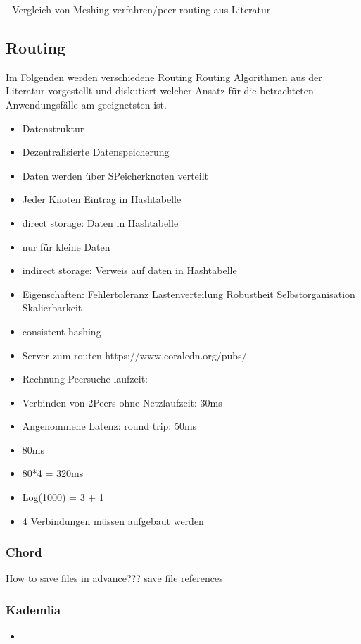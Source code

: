 - Vergleich von Meshing verfahren/peer routing aus Literatur
\subsection{Routing}
Im Folgenden werden verschiedene Routing \pTp Routing Algorithmen aus der Literatur vorgestellt und diskutiert welcher Ansatz für die betrachteten Anwendungsfälle am geeignetsten ist.

\begin{itemize}
	\item Datenstruktur
	\item  Dezentralisierte Datenspeicherung
	\item Daten werden über SPeicherknoten verteilt
	\item Jeder Knoten Eintrag in Hashtabelle
	\item direct storage: Daten in Hashtabelle
	\item nur für kleine Daten
	\item indirect storage: Verweis auf daten in Hashtabelle
	\item Eigenschaften:
Fehlertoleranz
Lastenverteilung
Robustheit
Selbstorganisation
Skalierbarkeit
	\item consistent hashing
	\item Server zum routen
https://www.coralcdn.org/pubs/
\end{itemize}

\begin{itemize}
	\item Rechnung Peersuche laufzeit:
	\item Verbinden von 2Peers ohne Netzlaufzeit: 30ms
	\item Angenommene Latenz: round trip: 50ms
	\item 80ms
	\item 80*4 = 320ms
	\item Log(1000) = 3 + 1 
	\item 4 Verbindungen müssen aufgebaut werden
\end{itemize}

\subsubsection{Chord}

How to save files in advance???
save file references
\subsubsection{Kademlia}
\begin{itemize}
	\item 
\end{itemize}
